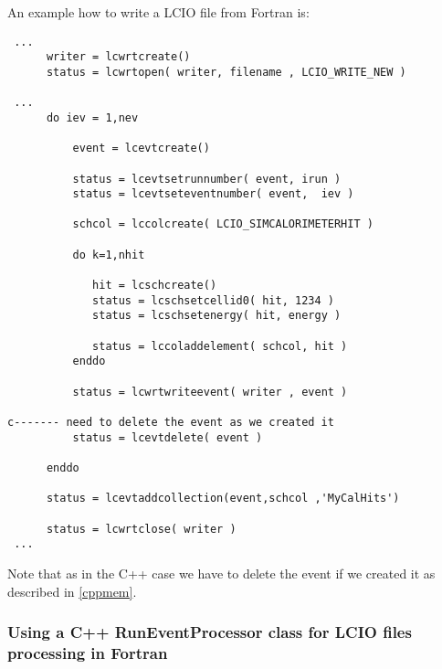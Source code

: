 An example how to write a LCIO file from Fortran is:

\begin{verbatim}
 ...
      writer = lcwrtcreate()
      status = lcwrtopen( writer, filename , LCIO_WRITE_NEW )

 ... 
      do iev = 1,nev
          
          event = lcevtcreate()

          status = lcevtsetrunnumber( event, irun ) 
          status = lcevtseteventnumber( event,  iev ) 
 
          schcol = lccolcreate( LCIO_SIMCALORIMETERHIT )

          do k=1,nhit

             hit = lcschcreate() 
             status = lcschsetcellid0( hit, 1234 ) 
             status = lcschsetenergy( hit, energy )

             status = lccoladdelement( schcol, hit ) 
          enddo

          status = lcwrtwriteevent( writer , event )
          
c------- need to delete the event as we created it
          status = lcevtdelete( event )

      enddo

      status = lcevtaddcollection(event,schcol ,'MyCalHits') 

      status = lcwrtclose( writer ) 
 ...
\end{verbatim}

Note that as in the C++ case we have to delete the event if we created it as described in \ref{cppmem}. \\

\subsubsection{Using a C++ RunEventProcessor class for LCIO files processing in Fortran}

